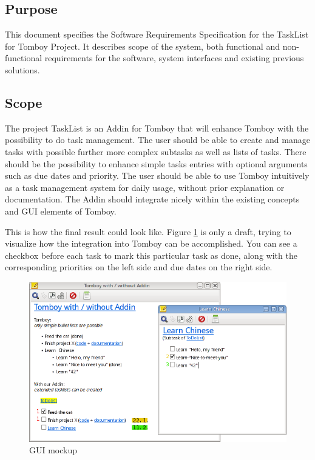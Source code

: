 \subsection{Purpose}
\label{intro:purpose}
This document specifies the Software Requirements Specification for the TaskList for Tomboy Project.
It describes scope of the system, both functional and non-functional requirements for the software, system interfaces and existing previous solutions.


\subsection{Scope}
\label{intro:scope}
The project TaskList is an Addin for Tomboy that will enhance Tomboy with the possibility to do task management. The user should be able to create and manage tasks with possible further more complex subtasks as well as lists of tasks.
There should be the possibility to enhance simple tasks entries with optional arguments such as due dates and priority.
The user should be able to use Tomboy intuitively as a task management system for daily usage, without prior explanation or documentation. The Addin should integrate nicely within the existing concepts and GUI elements of Tomboy.

This is how the final result could look like. Figure \ref{gui} is only a draft, trying to visualize how the integration into Tomboy can be accomplished. You can see a checkbox before each task to mark this particular task as done, along with the corresponding priorities on the left side and due dates on the right side.
\begin{figure}[h]
  \includegraphics[width=\textwidth]{graphics/Screenshot_cropped_edited.png}
  \caption{GUI mockup}
  \label{gui}
\end{figure}


